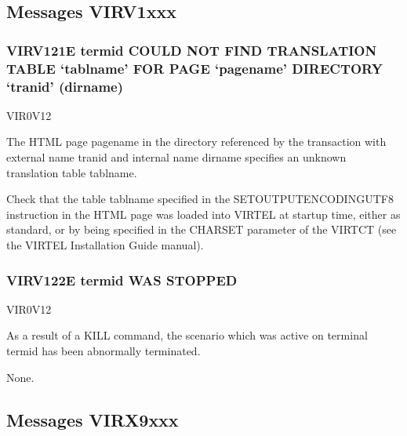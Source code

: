 \documentclass[letterpaper,10pt,english]{sphinxmanual}
\begin{document}
\subsection{Messages VIRV1xxx}
\label{\detokenize{messages:messages-virv1xxx}}

\subsubsection{VIRV121E termid COULD NOT FIND TRANSLATION TABLE ‘tablname’ FOR PAGE ‘pagename’ DIRECTORY ‘tranid’ (dirname)}
\label{\detokenize{messages:virv121e-termid-could-not-find-translation-table-tablname-for-page-pagename-directory-tranid-dirname}}\begin{description}
\sphinxAtStartPar
VIR0V12

\sphinxAtStartPar
The HTML page pagename in the directory referenced by the transaction with external name tranid and internal name dirname specifies an unknown translation table tablname.

\sphinxAtStartPar
Check that the table tablname specified in the SET\sphinxhyphen{}OUTPUT\sphinxhyphen{}ENCODING\sphinxhyphen{}UTF\sphinxhyphen{}8 instruction in the HTML page was loaded into VIRTEL at startup time, either as standard, or by being specified in the CHARSET parameter of the VIRTCT (see the VIRTEL Installation Guide manual).

\end{description}


\subsubsection{VIRV122E termid WAS STOPPED}
\label{\detokenize{messages:virv122e-termid-was-stopped}}\begin{description}
\sphinxAtStartPar
VIR0V12

\sphinxAtStartPar
As a result of a KILL command, the scenario which was active on terminal termid has been abnormally terminated.

\sphinxAtStartPar
None.

\end{description}


\subsection{Messages VIRX9xxx}
\label{\detokenize{messages:messages-virx9xxx}}
\end{document}
